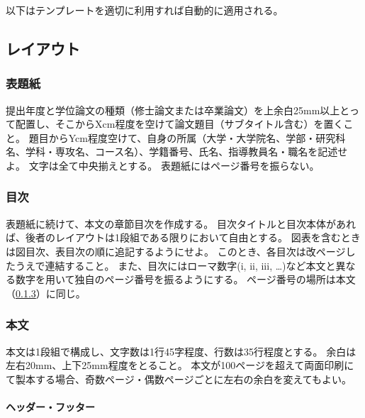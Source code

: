     以下はテンプレートを適切に利用すれば自動的に適用される。

    \subsection{レイアウト}
      \label{sub:layout}

      \subsubsection{表題紙}
        \label{subs:titlepage}

        提出年度と学位論文の種類（修士論文または卒業論文）を上余白25mm以上とって配置し、そこからXcm程度を空けて論文題目（サブタイトル含む）を置くこと。
        題目からYcm程度空けて、自身の所属（大学・大学院名、学部・研究科名、学科・専攻名、コース名）、学籍番号、氏名、指導教員名・職名を記述せよ。
        文字は全て中央揃えとする。
        表題紙にはページ番号を振らない。

      \subsubsection{目次}
        \label{subs:tableof}

        表題紙に続けて、本文の章節目次を作成する。
        目次タイトルと目次本体があれば、後者のレイアウトは1段組である限りにおいて自由とする。
        図表を含むときは図目次、表目次の順に追記するようにせよ。
        このとき、各目次は改ページしたうえで連結すること。
        また、目次にはローマ数字(i, ii, iii, \dots)など本文と異なる数字を用いて独自のページ番号を振るようにする。
        ページ番号の場所は本文（\cref{subs:body}）に同じ。

      \subsubsection{本文}
        \label{subs:body}

        本文は1段組で構成し、文字数は1行45字程度、行数は35行程度とする。
        余白は左右20mm、上下25mm程度をとること。
        本文が100ページを超えて両面印刷にて製本する場合、奇数ページ・偶数ページごとに左右の余白を変えてもよい。

        \paragraph{ヘッダー・フッター}
          \label{subs:header_footer}


